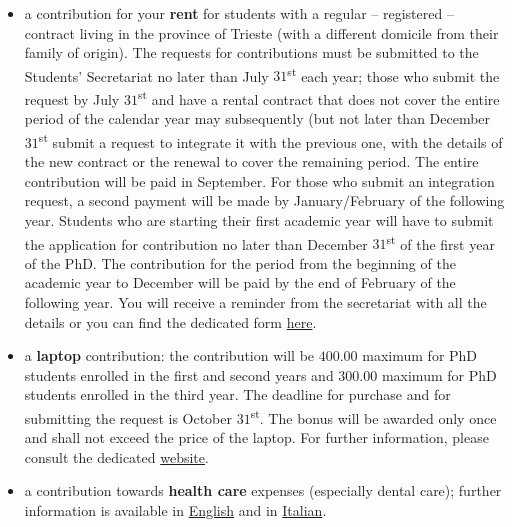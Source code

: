 \documentclass{sissavademecum}
\begin{document}
\begin{itemize}
    \item a contribution for your \textbf{rent} for students with a regular \--- registered \--- contract living in the province of Trieste (with a different domicile from their family of origin). The requests for contributions must be submitted to the Students' Secretariat no later than July $31$\textsuperscript{st} each year; those who submit the request by July $31$\textsuperscript{st} and have a rental contract that does not cover the entire period of the calendar year may subsequently (but not later than December $31$\textsuperscript{st} submit a request to integrate it with the previous one, with the details of the new contract or the renewal to cover the remaining period. The entire contribution will be paid in September. For those who submit an integration request, a second payment will be made by January/February of the following year. Students who are starting their first academic year will have to submit the application for contribution no later than December $31$\textsuperscript{st} of the first year of the PhD. The contribution for the period from the beginning of the academic year to December will be paid by the end of February of the following year.  You will receive a reminder from the secretariat with all the details or you can find the dedicated form \href{http://wiki.sissa.it/students/index.php/Contribution_towards_living_expenses}{here}.
    \item a \textbf{laptop} contribution: the contribution will be \EUR{} $400.00$ maximum for PhD students enrolled in the first and second years and \EUR{} $300.00$ maximum for PhD students enrolled in the third year. The deadline for purchase and for submitting the request is October $31$\textsuperscript{st}. The bonus will be awarded only once and shall not exceed the price of the laptop. For further information, please consult the dedicated \href{http://wiki.sissa.it/students/index.php/Laptop_contribution}{website}.
    \item a contribution towards\textbf{ health care} expenses (especially dental care); further information is available in \href{https://www.sissa.it/_media/documenti/english_regolamento_interventi.pdf}{English} and in \href{https://www.sissa.it/_media/documenti/regolamento-assistenziale.pdf}{Italian}.

\end{itemize}
\end{document}
